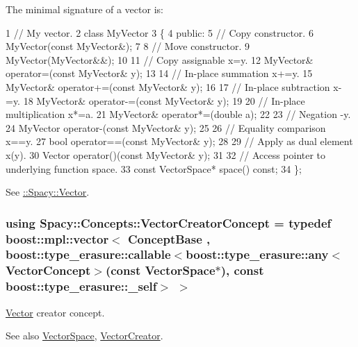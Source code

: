 \label{group__ConceptGroup_gad6958389d1fa2758a8a64a0a24c36004_VectorConceptAnchor}%
\hypertarget{group__ConceptGroup_gad6958389d1fa2758a8a64a0a24c36004_VectorConceptAnchor}{}%
The minimal signature of a vector is\+: 
\begin{DoxyCode}
1 // My vector.
2 class MyVector
3 \{
4 public:
5   // Copy constructor.
6   MyVector(const MyVector&);
7 
8   // Move constructor.
9   MyVector(MyVector&&);
10 
11   // Copy assignable x=y.
12   MyVector& operator=(const MyVector& y);
13 
14   // In-place summation x+=y.
15   MyVector& operator+=(const MyVector& y);
16 
17   // In-place subtraction x-=y.
18   MyVector& operator-=(const MyVector& y);
19 
20   // In-place multiplication x*=a.
21   MyVector& operator*=(double a);
22 
23   // Negation -y.
24   MyVector operator-(const MyVector& y);
25 
26   // Equality comparison x==y.
27   bool operator==(const MyVector& y);
28 
29   // Apply as dual element x(y).
30   Vector operator()(const MyVector& y);
31 
32   // Access pointer to underlying function space.
33   const VectorSpace* space() const;
34 \};
\end{DoxyCode}


See \hyperlink{group__SpacyGroup_gafc144d2730ef87a67e54f8cd750b1f54_VectorAnchor}{\+:\+:Spacy\+:\+:Vector}. \hypertarget{group__ConceptGroup_ga3064301642b7c66b1b08f88a12a04645_ga3064301642b7c66b1b08f88a12a04645}{}
\subsubsection[{Vector\+Creator\+Concept}]{\setlength{\rightskip}{0pt plus 5cm}using {\bf Spacy\+::\+Concepts\+::\+Vector\+Creator\+Concept} = typedef boost\+::mpl\+::vector$<$ {\bf Concept\+Base} , boost\+::type\+\_\+erasure\+::callable$<$boost\+::type\+\_\+erasure\+::any$<${\bf Vector\+Concept}$>$(const {\bf Vector\+Space}$\ast$), const boost\+::type\+\_\+erasure\+::\+\_\+self$>$ $>$}\label{group__ConceptGroup_ga3064301642b7c66b1b08f88a12a04645_ga3064301642b7c66b1b08f88a12a04645}


\hyperlink{classSpacy_1_1Vector}{Vector} creator concept. 

\label{group__ConceptGroup_ga3064301642b7c66b1b08f88a12a04645_VectorCreatorConceptAnchor}%
\hypertarget{group__ConceptGroup_ga3064301642b7c66b1b08f88a12a04645_VectorCreatorConceptAnchor}{}%
\begin{DoxySeeAlso}{See also}
\hyperlink{classSpacy_1_1VectorSpace}{Vector\+Space}, \hyperlink{group__SpacyGroup_ga1f5316487c031a478247206764bb2efb_VectorCreatorAnchor}{Vector\+Creator}. 
\end{DoxySeeAlso}
